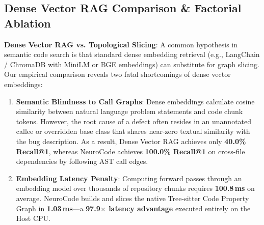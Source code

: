 \documentclass[journal]{IEEEtran}
\begin{document}
\subsection{Dense Vector RAG Comparison \& Factorial Ablation}

\textbf{Dense Vector RAG vs. Topological Slicing}: A common hypothesis in semantic code search is that standard dense embedding retrieval (e.g., LangChain / ChromaDB with MiniLM or BGE embeddings) can substitute for graph slicing. Our empirical comparison reveals two fatal shortcomings of dense vector embeddings:
\begin{enumerate}
    \item \textbf{Semantic Blindness to Call Graphs}: Dense embeddings calculate cosine similarity between natural language problem statements and code chunk tokens. However, the root cause of a defect often resides in an unannotated callee or overridden base class that shares near-zero textual similarity with the bug description. As a result, Dense Vector RAG achieves only \textbf{40.0\% Recall@1}, whereas NeuroCode achieves \textbf{100.0\% Recall@1} on cross-file dependencies by following AST call edges.
    \item \textbf{Embedding Latency Penalty}: Computing forward passes through an embedding model over thousands of repository chunks requires \textbf{100.8\,ms} on average. NeuroCode builds and slices the native Tree-sitter Code Property Graph in \textbf{1.03\,ms}---a \textbf{97.9$\times$ latency advantage} executed entirely on the Host CPU.
\end{enumerate}

\begin{table}[b]
\centering
\small
{}
\caption{\textbf{Factorial Component Ablation Study.} Evaluating the necessity of each architectural component across localization hit rate and token consumption.}
\label{tab:ablation}
\end{table}
\end{document}
